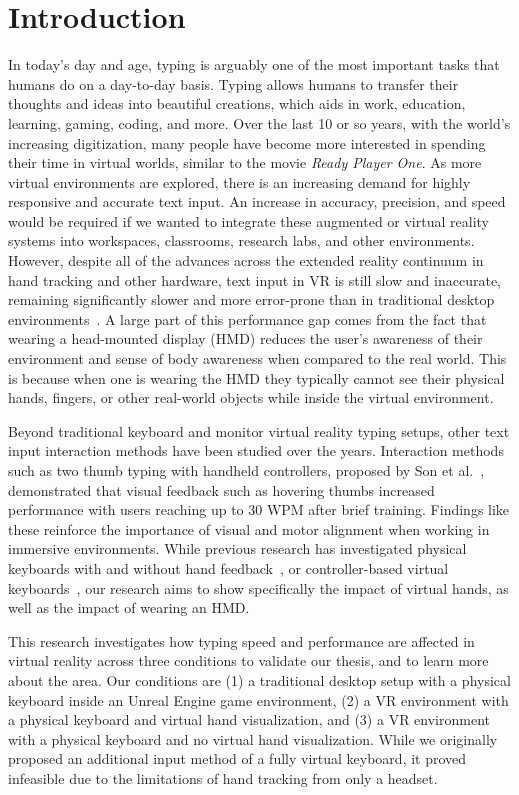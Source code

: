 \documentclass[acmlarge]{acmart}
\begin{document}
\section{Introduction}
In today's day and age, typing is arguably one of the most important tasks that humans do on a day-to-day basis. Typing allows humans to transfer their thoughts and ideas into beautiful creations, which aids in work, education, learning, gaming, coding, and more. Over the last 10 or so years, with the world's increasing digitization, many people have become more interested in spending their time in virtual worlds, similar to the movie \textit{Ready Player One}. As more virtual environments are explored, there is an increasing demand for highly responsive and accurate text input. An increase in accuracy, precision, and speed would be required if we wanted to integrate these augmented or virtual reality systems into workspaces, classrooms, research labs, and other environments. However, despite all of the advances across the extended reality continuum in hand tracking and other hardware, text input in VR is still slow and inaccurate, remaining significantly slower and more error-prone than in traditional desktop environments~\cite{Son2019}. A large part of this performance gap comes from the fact that wearing a head-mounted display (HMD) reduces the user's awareness of their environment and sense of body awareness when compared to the real world. This is because when one is wearing the HMD they typically cannot see their physical hands, fingers, or other real-world objects while inside the virtual environment. 

Beyond traditional keyboard and monitor virtual reality typing setups, other text input interaction methods have been studied over the years. Interaction methods such as two thumb typing with handheld controllers, proposed by Son et al.~\cite{Son2019}, demonstrated that visual feedback such as hovering thumbs increased performance with users reaching up to 30 WPM after brief training. Findings like these reinforce the importance of visual and motor alignment when working in immersive environments. While previous research has investigated physical keyboards with and without hand feedback~\cite{Knierim2018}, or controller-based virtual keyboards~\cite{Boletsis2019, Dudley2019}, our research aims to show specifically the impact of virtual hands, as well as the impact of wearing an HMD.

This research investigates how typing speed and performance are affected in virtual reality across three conditions to validate our thesis, and to learn more about the area. Our conditions are (1) a traditional desktop setup with a physical keyboard inside an Unreal Engine game environment, (2) a VR environment with a physical keyboard and virtual hand visualization, and (3) a VR environment with a physical keyboard and no virtual hand visualization. While we originally proposed an additional input method of a fully virtual keyboard, it proved infeasible due to the limitations of hand tracking from only a headset.
\end{document}
